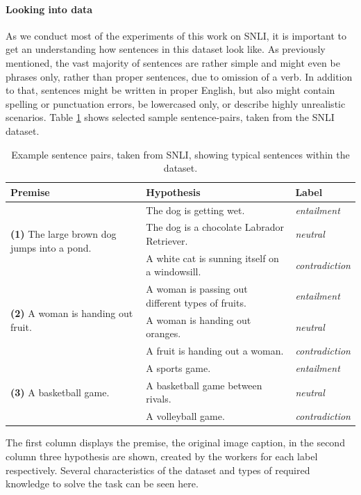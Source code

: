 \paragraph*{Looking into data}
As we conduct most of the experiments of this work on \ac{SNLI}, it is important to get an understanding how sentences in this dataset look like. As previously mentioned, the vast majority of sentences are rather simple and might even be phrases only, rather than proper sentences, due to omission of a verb. In addition to that, sentences might be written in proper English, but also might contain spelling or punctuation errors, be lowercased only, or describe highly unrealistic scenarios.  Table \ref{table:snli_example} shows selected sample sentence-pairs, taken from the \ac{SNLI} dataset.
\begin{center}
\begin{table}[htt]
\begin{center}
\begin{tabular}{lll}
\textbf{Premise} & \textbf{Hypothesis} & \textbf{Label} \\
\toprule
\multirow{3}{*}{\textbf{(1)} The large brown dog jumps into a pond.} & The dog is getting wet. & \textit{entailment} \\ & The dog is a chocolate Labrador Retriever. & \textit{neutral} \\
&A white cat is sunning itself on a windowsill. & \textit{contradiction} \\
\midrule
\multirow{3}{*}{\textbf{(2)} A woman is handing out fruit.} & A woman is passing out different types of fruits. & \textit{entailment} \\
&A woman is handing out oranges. & \textit{neutral} \\
&A fruit is handing out a woman. & \textit{contradiction} \\
\midrule
\multirow{3}{*}{\textbf{(3)} A basketball game.} & A sports game. & \textit{entailment} \\
&A basketball game between rivals. & \textit{neutral} \\
&A volleyball game. & \textit{contradiction} \\
\bottomrule
\end{tabular}
\end{center}
\caption{Example sentence pairs, taken from \ac{SNLI}, showing typical sentences within the dataset.}
\label{table:snli_example}
\end{table}
\end{center}
The first column displays the premise, the original image caption, in the second column three hypothesis are shown, created by the workers for each label respectively. Several characteristics of the dataset and types of required knowledge to solve the task can be seen here. 

